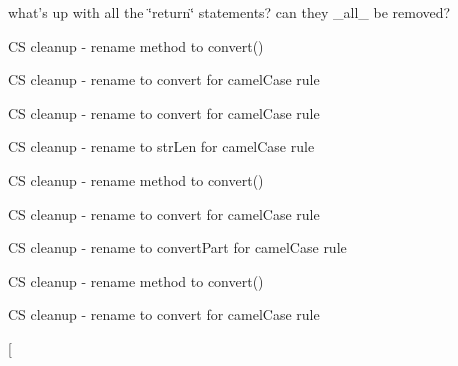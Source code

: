 \begin{DoxyRefList}
what's up with all the \char`\"{}return\char`\"{} statements? can they \-\_\-all\-\_\- be removed?  
\item[\label{todo__todo000035}%
\hypertarget{todo__todo000035}{}%
\-Global \hyperlink{classparser_i_ad6c06bea9d11cc1c362b592306cfa707}{parser\-I} (\&\$c)]\-C\-S cleanup -\/ rename method to convert()  
\item[\label{todo__todo000118}%
\hypertarget{todo__todo000118}{}%
\-Global \hyperlink{classparser_id_inline_tag_ad6c06bea9d11cc1c362b592306cfa707}{parser\-Id\-Inline\-Tag} (\&\$c)]\-C\-S cleanup -\/ rename to convert for camel\-Case rule  
\item[\label{todo__todo000117}%
\hypertarget{todo__todo000117}{}%
\-Global \hyperlink{classparser_inheritdoc_inline_tag_a8ec835af4f74f124dab78001882a9ea9}{parser\-Inheritdoc\-Inline\-Tag} ()]\-C\-S cleanup -\/ rename to convert for camel\-Case rule  
\item[\label{todo__todo000111}%
\hypertarget{todo__todo000111}{}%
\-Global \hyperlink{classparser_inline_tag_a92d09a6e9b43c6fde4e695c0decc73cd}{parser\-Inline\-Tag} ()]\-C\-S cleanup -\/ rename to str\-Len for camel\-Case rule  
\item[\label{todo__todo000038}%
\hypertarget{todo__todo000038}{}%
\-Global \hyperlink{classparser_kbd_ad6c06bea9d11cc1c362b592306cfa707}{parser\-Kbd} (\&\$c)]\-C\-S cleanup -\/ rename method to convert()  
\item[\label{todo__todo000112}%
\hypertarget{todo__todo000112}{}%
\-Global \hyperlink{classparser_link_inline_tag_ad6c06bea9d11cc1c362b592306cfa707}{parser\-Link\-Inline\-Tag} (\&\$c)]\-C\-S cleanup -\/ rename to convert for camel\-Case rule  
\item[\label{todo__todo000113}%
\hypertarget{todo__todo000113}{}%
\-Global \hyperlink{classparser_link_inline_tag_a079249f7f358ce69316bf82f42f6d853}{parser\-Link\-Inline\-Tag} (\&\$c, \$value)]\-C\-S cleanup -\/ rename to convert\-Part for camel\-Case rule  
\item[\label{todo__todo000040}%
\hypertarget{todo__todo000040}{}%
\-Global \hyperlink{classparser_list_ad6c06bea9d11cc1c362b592306cfa707}{parser\-List} (\&\$c)]\-C\-S cleanup -\/ rename method to convert()  
\item[\label{todo__todo000064}%
\hypertarget{todo__todo000064}{}%
\-Global \hyperlink{classparser_name_tag_ad6c06bea9d11cc1c362b592306cfa707}{parser\-Name\-Tag} (\&\$c)]\-C\-S cleanup -\/ rename to convert for camel\-Case rule  
\item[\label{todo__todo000144}%

\end{DoxyRefList}

